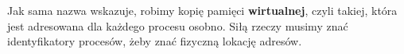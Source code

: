 Jak sama nazwa wskazuje, robimy kopię pamięci \textbf{wirtualnej}, czyli takiej, która jest adresowana dla każdego procesu osobno.
Siłą rzeczy musimy znać identyfikatory procesów, żeby znać fizyczną lokację adresów.
